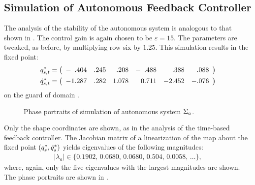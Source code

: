 \subsection{Simulation of Autonomous Feedback Controller}

The analysis of the stability of the autonomous system is analogous to that
shown in .
%
The control gain is again chosen to be $\varepsilon = 15$.
%
The parameters are tweaked, as before, by multiplying row six by $1.25$.
%
This simulation results in the fixed point:
%
\begin{align*}
  q^{*}_{s,t} &=
  \left(\begin{array}{r r r r r r}
      -\hphantom{1}.404 & .245 & \hphantom{1}.208 & -\hphantom{0}.488 &
      \hphantom{-2}.388 & \hphantom{-}.088
  \end{array}\right)\\
  \dot{q}^{*}_{s,t} &=
  \left(\begin{array}{r r r r r r}
    -1.287 & .282 & 1.078 & \hphantom{-}0.711 & -2.452 & -.076
  \end{array}\right)
\end{align*}
on the guard of domain {\DC}.
%
\begin{figure*}[tp!]
  \centering
  \caption{Phase portraits of simulation of autonomous system $\Sigma_{a}$.}
  \label{fig:pp-a}
\end{figure*} 
%
Only the shape coordinates are shown, as in the analysis of the time-based
feedback controller.
%
The Jacobian matrix of a linearization of the \Poincare{} map about the fixed
point $(q^{*}_{s}, \dot{q}^{*}_{s})$ yields eigenvalues of the following
magnitudes:
%
\begin{align*}
  |\lambda_{a}| \in \{0.1902, \, 0.0680, \, 0.0680, \, 0.504, \, 0.0058, \,
  \ldots\},
\end{align*}
where, again, only the five eigenvalues with the largest magnitudes are shown.
%
The phase portraits are shown in .
